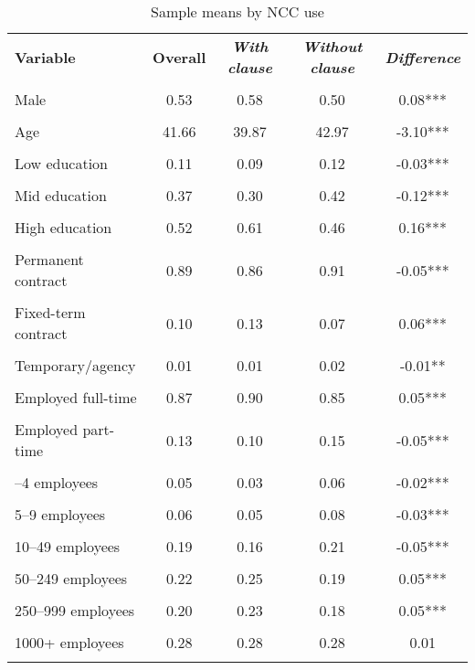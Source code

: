 \begin{table}[!ht]\centering
\caption{Sample means by NCC use}
\label{tab:sample_means_ncc_Belgium} %
\begin{tabular}{lcccc}\toprule
\textbf{Variable} & \textbf{Overall} & \textbf{\textit{With clause}} & \textbf{\textit{Without clause}} & \textbf{\textit{Difference}} \\\\ \midrule
Male & 0.53 & 0.58 & 0.50 & 0.08*** \\\\
Age & 41.66 & 39.87 & 42.97 & -3.10*** \\\\
\addlinespace
Low education & 0.11 & 0.09 & 0.12 & -0.03*** \\\\
Mid education & 0.37 & 0.30 & 0.42 & -0.12*** \\\\
High education & 0.52 & 0.61 & 0.46 & 0.16*** \\\\
\addlinespace
Permanent contract & 0.89 & 0.86 & 0.91 & -0.05*** \\\\
Fixed-term contract & 0.10 & 0.13 & 0.07 & 0.06*** \\\\
Temporary/agency & 0.01 & 0.01 & 0.02 & -0.01** \\\\
\addlinespace
Employed full-time & 0.87 & 0.90 & 0.85 & 0.05*** \\\\
Employed part-time & 0.13 & 0.10 & 0.15 & -0.05*** \\\\
\addlinespace
1–4 employees & 0.05 & 0.03 & 0.06 & -0.02*** \\\\
5–9 employees & 0.06 & 0.05 & 0.08 & -0.03*** \\\\
10–49 employees & 0.19 & 0.16 & 0.21 & -0.05*** \\\\
50–249 employees & 0.22 & 0.25 & 0.19 & 0.05*** \\\\
250–999 employees & 0.20 & 0.23 & 0.18 & 0.05*** \\\\
1000+ employees & 0.28 & 0.28 & 0.28 & 0.01 \\\\
\bottomrule\end{tabular}\end{table}
